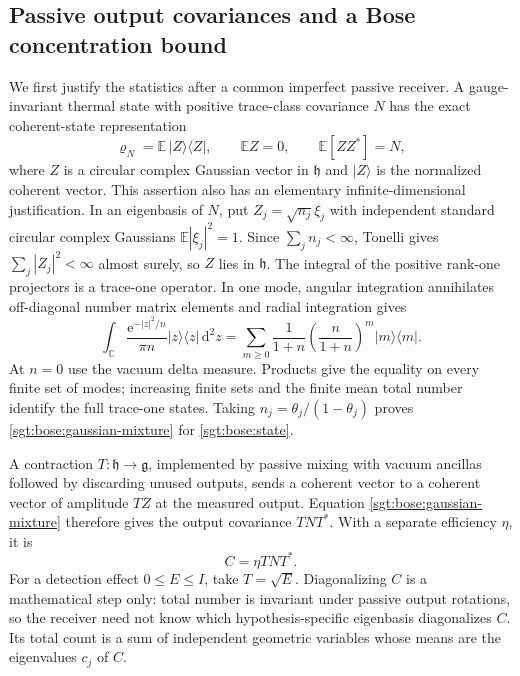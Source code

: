 \documentclass[aps,pra,reprint,superscriptaddress,longbibliography]{revtex4-2}
\newcommand{\dd}{\mathrm d}
\newcommand{\ee}{\mathrm e}
\begin{document}
\subsection{Passive output covariances and a Bose concentration bound}
\label{sgt:bose:concentration-section}

We first justify the statistics after a common imperfect passive
receiver.  A gauge-invariant thermal state with positive trace-class
covariance $N$ has the exact coherent-state representation
\begin{equation}
 \varrho_N=\mathbb E\,|Z\rangle\langle Z|,
 \qquad \mathbb E Z=0,\qquad
 \mathbb E[ZZ^*]=N,
 \label{sgt:bose:gaussian-mixture}
\end{equation}
where $Z$ is a circular complex Gaussian vector in $\mathfrak h$ and
$|Z\rangle$ is the normalized coherent vector.  This assertion also
has an elementary infinite-dimensional justification.  In an eigenbasis
of $N$, put $Z_j=\sqrt{n_j}\xi_j$ with independent standard circular
complex Gaussians $\mathbb E|\xi_j|^2=1$.  Since $\sum_jn_j<\infty$,
Tonelli gives $\sum_j|Z_j|^2<\infty$ almost surely, so $Z$ lies in
$\mathfrak h$.  The integral of the positive rank-one projectors is a
trace-one operator.  In one mode, angular integration annihilates
off-diagonal number matrix elements and radial integration gives
\begin{equation}
 \int_{\mathbb C}\frac{\ee^{-|z|^2/n}}{\pi n}
       |z\rangle\langle z|\,\dd^2z
   =\sum_{m\ge0}\frac1{1+n}
                \left(\frac{n}{1+n}\right)^m|m\rangle\langle m|.
 \label{sgt:bose:one-mode-mixture}
\end{equation}
At $n=0$ use the vacuum delta measure.  Products give the equality on
every finite set of modes; increasing finite sets and the finite mean
total number identify the full trace-one states.  Taking
$n_j=\theta_j/(1-\theta_j)$ proves \eqref{sgt:bose:gaussian-mixture}
for \eqref{sgt:bose:state}.

A contraction $T:\mathfrak h\to\mathfrak g$, implemented by passive
mixing with vacuum ancillas followed by discarding unused outputs,
sends a coherent vector to a coherent vector of amplitude $TZ$ at
the measured output.  Equation \eqref{sgt:bose:gaussian-mixture}
therefore gives the output covariance $TNT^*$.  With a separate
efficiency $\eta$, it is
\begin{equation}
 C=\eta TNT^*.
 \label{sgt:bose:passive-covariance}
\end{equation}
For a detection effect $0\le E\le I$, take $T=\sqrt E$.  Diagonalizing
$C$ is a mathematical step only: total number is invariant under
passive output rotations, so the receiver need not know which
hypothesis-specific eigenbasis diagonalizes $C$.  Its total count is
a sum of independent geometric variables whose means are the
eigenvalues $c_j$ of $C$.
\end{document}
